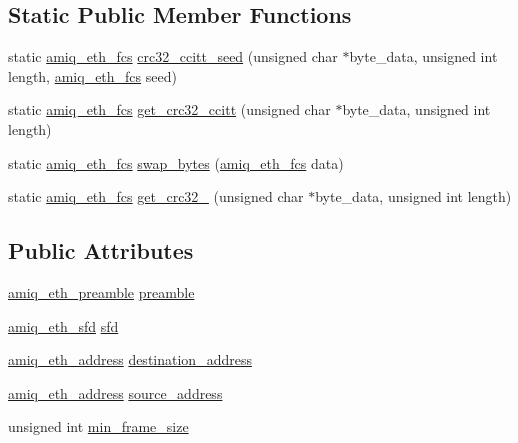 \subsection*{Static Public Member Functions}
\begin{DoxyCompactItemize}
\item 
static \hyperlink{amiq__eth__types_8cpp_adb511dc715b55539c6abdad1de981a9f}{amiq\_\-eth\_\-fcs} \hyperlink{classamiq__eth__packet_ac090905485be6152d3904c08ef576d3d}{crc32\_\-ccitt\_\-seed} (unsigned char $\ast$byte\_\-data, unsigned int length, \hyperlink{amiq__eth__types_8cpp_adb511dc715b55539c6abdad1de981a9f}{amiq\_\-eth\_\-fcs} seed)
\item 
static \hyperlink{amiq__eth__types_8cpp_adb511dc715b55539c6abdad1de981a9f}{amiq\_\-eth\_\-fcs} \hyperlink{classamiq__eth__packet_a873819b36fc796deb1e97bd7d18d4a67}{get\_\-crc32\_\-ccitt} (unsigned char $\ast$byte\_\-data, unsigned int length)
\item 
static \hyperlink{amiq__eth__types_8cpp_adb511dc715b55539c6abdad1de981a9f}{amiq\_\-eth\_\-fcs} \hyperlink{classamiq__eth__packet_a1d83e7013b03e4cb3cccca9d4cae3a4e}{swap\_\-bytes} (\hyperlink{amiq__eth__types_8cpp_adb511dc715b55539c6abdad1de981a9f}{amiq\_\-eth\_\-fcs} data)
\item 
static \hyperlink{amiq__eth__types_8cpp_adb511dc715b55539c6abdad1de981a9f}{amiq\_\-eth\_\-fcs} \hyperlink{classamiq__eth__packet_a52f95dacb2ead62a53d11491b8b3f445}{get\_\-crc32\_} (unsigned char $\ast$byte\_\-data, unsigned int length)
\end{DoxyCompactItemize}
\subsection*{Public Attributes}
\begin{DoxyCompactItemize}
\item 
\hyperlink{amiq__eth__types_8cpp_aa38046dc0a58f891a7383b5ac27cb621}{amiq\_\-eth\_\-preamble} \hyperlink{classamiq__eth__packet_a222c60f5498580313a81f07c58782d4c}{preamble}
\item 
\hyperlink{amiq__eth__types_8cpp_a3feab3e58bfe4fa7ee2f560fe2ba6d02}{amiq\_\-eth\_\-sfd} \hyperlink{classamiq__eth__packet_a03b98e9cda79e6715ac4b38f2ca51569}{sfd}
\item 
\hyperlink{amiq__eth__types_8cpp_a76a5a0c4430f7bd4f0773ac89fcc104a}{amiq\_\-eth\_\-address} \hyperlink{classamiq__eth__packet_a03a4cb1ee40c7aaa8db2c8a8560086ae}{destination\_\-address}
\item 
\hyperlink{amiq__eth__types_8cpp_a76a5a0c4430f7bd4f0773ac89fcc104a}{amiq\_\-eth\_\-address} \hyperlink{classamiq__eth__packet_a04153feceffaf9c897706f2143261980}{source\_\-address}
\item 
unsigned int \hyperlink{classamiq__eth__packet_a4e1eca2891cd445b62dbd17a98a5fc22}{min\_\-frame\_\-size}
\end{DoxyCompactItemize}


